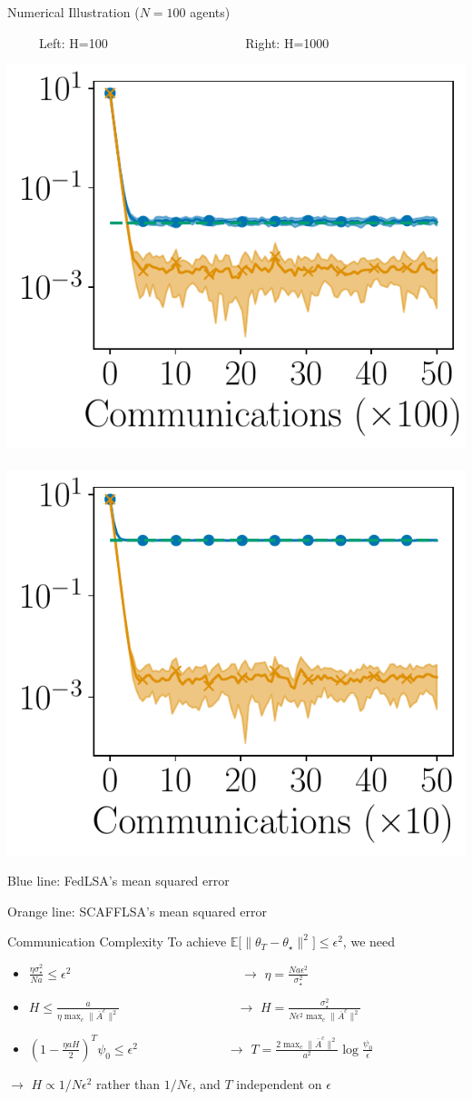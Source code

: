 \documentclass[aspectratio=169,14pt]{beamer}
\begin{document}
\begin{frame}{Numerical Illustration ($N=100$ agents)}
  \vspace{-0.5em}
  
  \begin{center}
    ~~~~~Left: H=100~~~~~~~~~~~~~~~~~~~~~
    Right: H=1000
 
    \vspace{-1em}
   
    \includegraphics[width=0.4\linewidth]{images/plot_hg_100_n100.pdf}
    ~~
    \includegraphics[width=0.4\linewidth]{images/plot_hg_1000_n100.pdf}
  \end{center}

  \vspace{-1em}

  Blue line: FedLSA's mean squared error

  \vspace{-1em}

  Orange line: SCAFFLSA's mean squared error
\end{frame}



\begin{frame}{Communication Complexity}
  To achieve $\mathbb{E} \Big[ \| {\theta_T - \theta_\star} \|^2 \Big] \le \epsilon^2$, we need
  \begin{itemize}
  \item $\frac{\eta \sigma_\star^2}{N a} \le \epsilon^2$ ~~~~~~\,~~~~~~~~~~~~~~~~~~~ $\rightarrow$ $\eta = \frac{N a \epsilon^2}{\sigma_\star^2}$
  \item $H \le \frac{a}{\eta \max_c \| \bar{A}^c \|^2}$ ~~~~~~~~~~~~~~~~~ $\rightarrow$ $H = \frac{ \sigma_\star^2 }{N \epsilon^2 \max_c \| \bar{A}^c \|^2}$
  \item $(1 - \frac{\eta a H}{2})^{T} \psi_0 \le \epsilon^2$ ~~~~~~~~~~~\,~~$\rightarrow$ $T = \frac{2 \max_c \| \bar{A}^c \|^2}{a^2} \log \tfrac{\psi_0}{ \epsilon }$
  \end{itemize}

  $\rightarrow$ $H \propto 1/N\epsilon^2$ rather than $1/N\epsilon$, and $T$ independent on $\epsilon$


\end{frame}
\end{document}
